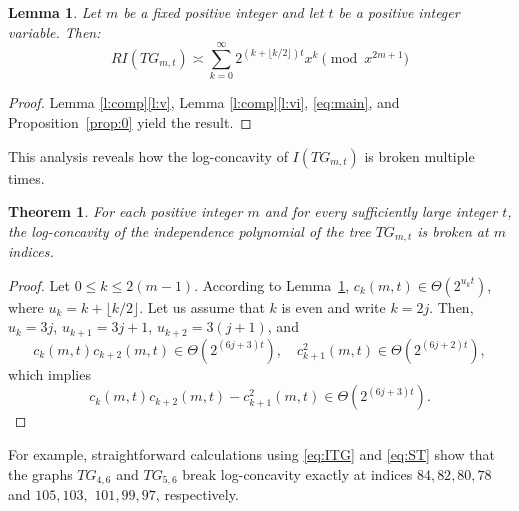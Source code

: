 \documentclass[reqno]{amsart}
\newtheorem{theorem}{Theorem}
\newtheorem{lemma}{Lemma}
\newcommand{\floor}[1]{\lfloor #1\rfloor}
\begin{document}
\begin{lemma}\label{l:coeffTG} Let $m$ be a fixed positive integer and let $t$ be a positive integer variable. Then:
\[
RI(TG_{m,t})\asymp \sum_{k=0}^{\infty}2^{(k+\floor{k/2})t} x^k\pmod{x^{2m+1}}
\]
\end{lemma}
\begin{proof} Lemma \ref{l:comp}\eqref{l:v}, Lemma \ref{l:comp}\eqref{l:vi}, \eqref{eq:main}, and Proposition~\ref{prop:0} yield the result.
\end{proof}



This analysis reveals how the log-concavity  of $I(TG_{m,t})$ is broken multiple times.

\begin{theorem}\label{thm:main}
  For each positive integer $m$ and for every sufficiently large integer $t$, the log-concavity of the independence polynomial of the tree $TG_{m,t}$ is broken at $m$ indices.
\end{theorem}
\begin{proof}
Let $0 \leq k \leq 2(m-1)$. According to Lemma~\ref{l:coeffTG}, $c_k(m,t)\in\Theta(2^{u_kt})$, where $u_k=k+\floor{k/2}$. Let us assume that $k$ is even and write $k=2j$. Then, $u_k = 3j$, $u_{k+1} = 3j + 1$, $u_{k+2}=3(j+1)$, and 
\[
c_k(m,t) c_{k+2}(m,t) \in \Theta(2^{(6j+3)t}), \quad c_{k+1}^2(m,t) \in \Theta(2^{(6j+2)t}),
\]
which implies
\[
c_k(m,t)c_{k+2}(m,t) - c_{k+1}^2(m,t) \in \Theta(2^{(6j+3)t}).
\]
\end{proof}



 For example, straightforward calculations using \eqref{eq:ITG} and \eqref{eq:ST} show that the graphs $TG_{4,6}$ and $TG_{5,6}$ break log-concavity exactly at indices $84, 82, 80, 78$ and $105, 103,$ $101, 99, 97$, respectively. 






% 
 

\end{document}
